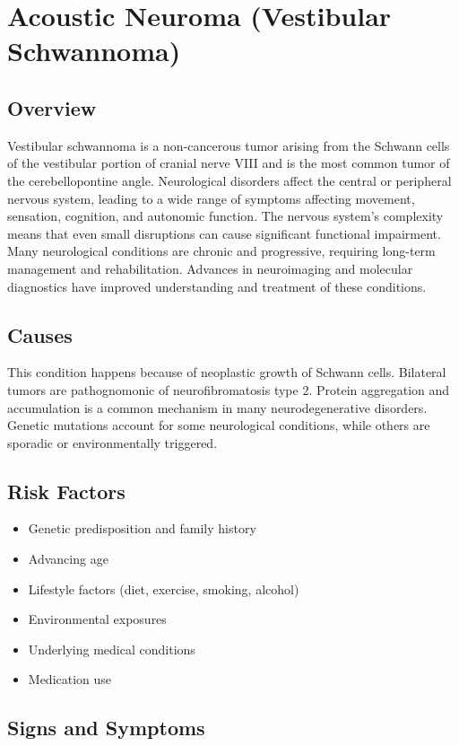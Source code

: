 \chapter{Acoustic Neuroma (Vestibular Schwannoma)}
\label{sec:Acoustic Neuroma (Vestibular Schwannoma)}

\section{Overview}
Vestibular schwannoma is a non-cancerous tumor arising from the Schwann cells of the vestibular portion of cranial nerve VIII and is the most common tumor of the cerebellopontine angle. Neurological disorders affect the central or peripheral nervous system, leading to a wide range of symptoms affecting movement, sensation, cognition, and autonomic function. The nervous system's complexity means that even small disruptions can cause significant functional impairment. Many neurological conditions are chronic and progressive, requiring long-term management and rehabilitation. Advances in neuroimaging and molecular diagnostics have improved understanding and treatment of these conditions.
\section{Causes}
This condition happens because of neoplastic growth of Schwann cells. Bilateral tumors are pathognomonic of neurofibromatosis type 2.   Protein aggregation and accumulation is a common mechanism in many neurodegenerative disorders.  Genetic mutations account for some neurological conditions, while others are sporadic or environmentally triggered.   
\section{Risk Factors}
\begin{itemize}[noitemsep]
  \item Genetic predisposition and family history
  \item Advancing age
  \item Lifestyle factors (diet, exercise, smoking, alcohol)
  \item Environmental exposures
  \item Underlying medical conditions
  \item Medication use
\end{itemize}
\section{Signs and Symptoms}
